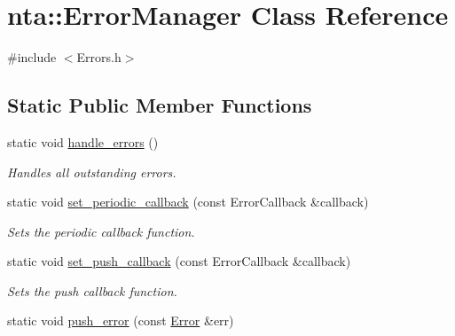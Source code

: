 \hypertarget{classnta_1_1ErrorManager}{}\section{nta\+:\+:Error\+Manager Class Reference}
\label{classnta_1_1ErrorManager}


{\ttfamily \#include $<$Errors.\+h$>$}

\subsection*{Static Public Member Functions}
\begin{DoxyCompactItemize}
\item 
\mbox{\label{classnta_1_1ErrorManager_adca13bc3b6b36366c0a803ce43daf90d}} 
static void \hyperlink{classnta_1_1ErrorManager_adca13bc3b6b36366c0a803ce43daf90d}{handle\+\_\+errors} ()
\begin{DoxyCompactList}\small\item\em Handles all outstanding errors. \end{DoxyCompactList}\item 
\mbox{\label{classnta_1_1ErrorManager_a7a8c3c22602b437d160e860da877fffe}} 
static void \hyperlink{classnta_1_1ErrorManager_a7a8c3c22602b437d160e860da877fffe}{set\+\_\+periodic\+\_\+callback} (const Error\+Callback \&callback)
\begin{DoxyCompactList}\small\item\em Sets the periodic callback function. \end{DoxyCompactList}\item 
\mbox{\label{classnta_1_1ErrorManager_acd7eb6eafdace10701e4e59bd727a823}} 
static void \hyperlink{classnta_1_1ErrorManager_acd7eb6eafdace10701e4e59bd727a823}{set\+\_\+push\+\_\+callback} (const Error\+Callback \&callback)
\begin{DoxyCompactList}\small\item\em Sets the push callback function. \end{DoxyCompactList}\item 
\mbox{\label{classnta_1_1ErrorManager_a5e12c42f103bfa290699c08c98d681a2}} 
static void \hyperlink{classnta_1_1ErrorManager_a5e12c42f103bfa290699c08c98d681a2}{push\+\_\+error} (const \hyperlink{structnta_1_1Error}{Error} \&err)

\end{DoxyCompactItemize}
